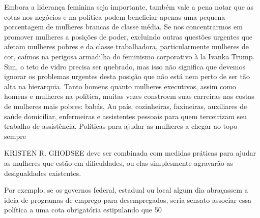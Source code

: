  \par 
Embora a liderança feminina seja importante, também vale a pena notar que as cotas nos negócios e na política podem beneficiar apenas uma pequena porcentagem de mulheres brancas de classe média. Se nos concentrarmos em promover mulheres a posições de poder, excluindo outras questões urgentes que afetam mulheres pobres e da classe trabalhadora, particularmente mulheres de cor, caímos na perigosa armadilha do feminismo corporativo à la Ivanka Trump. Sim, o teto de vidro precisa ser quebrado, mas isso não significa que devemos ignorar os problemas urgentes desta posição que não está nem perto de ser tão alta na hierarquia. Tanto homens quanto mulheres executivos, assim como homens e mulheres na política, muitas vezes constroem suas carreiras nas costas de mulheres mais pobres: babás, Au país, cozinheiras, faxineiras, auxiliares de saúde domiciliar, enfermeiras e assistentes pessoais para quem terceirizam seu trabalho de assistência. Políticas para ajudar as mulheres a chegar ao topo sempre
 \par 
KRISTEN R. GHODSEE deve ser combinada com medidas práticas para ajudar as mulheres que estão em dificuldades, ou elas simplesmente agravarão as desigualdades existentes.
 \par 
Por exemplo, se os governos federal, estadual ou local algum dia abraçassem a ideia de programas de emprego para desempregados, seria sensato associar essa política a uma cota obrigatória estipulando que 50%

